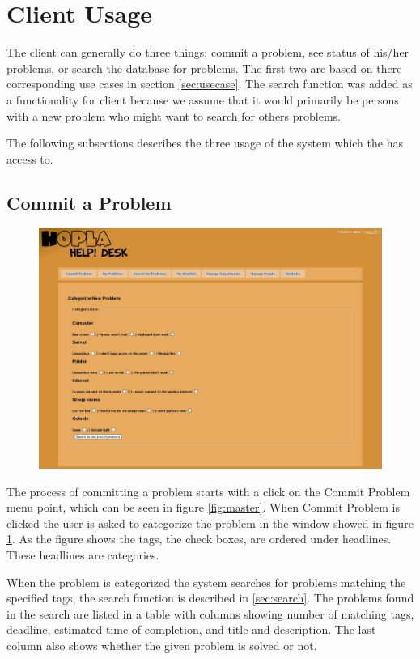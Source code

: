 \section{Client Usage}
\label{sec:client_usage}
The client can generally do three things; commit a problem, see status of his/her problems, or search the database for problems.
The first two are based on there corresponding use cases in section \ref{sec:usecase}.
The search function was added as a functionality for client because we assume that it would primarily be persons with a new problem who might want to search for others problems.

The following subsections describes the three usage of the system which the \aclient[] has access to.

\subsection{Commit a Problem}
\begin{figure}[htb]
	\centering
		\includegraphics[width=1.00\textwidth, clip=true, trim=2.9cm 0.5cm 3cm 8cm]{input/implementation/program_presentation/commit.png}
	\label{fig:commit}
\end{figure}
The process of committing a problem starts with a click on the Commit Problem menu point, which can be seen in figure \ref{fig:master}.
When Commit Problem is clicked the user is asked to categorize the problem in the window showed in figure \ref{fig:commit}.
As the figure shows the tags, the check boxes, are ordered under headlines.
These headlines are categories.

When the problem is categorized the system searches for problems matching the specified tags, the search function is described in \ref{sec:search}.
The problems found in the search are listed in a table with columns showing number of matching tags, deadline, estimated time of completion, and title and description.
The last column also shows whether the given problem is solved or not.

